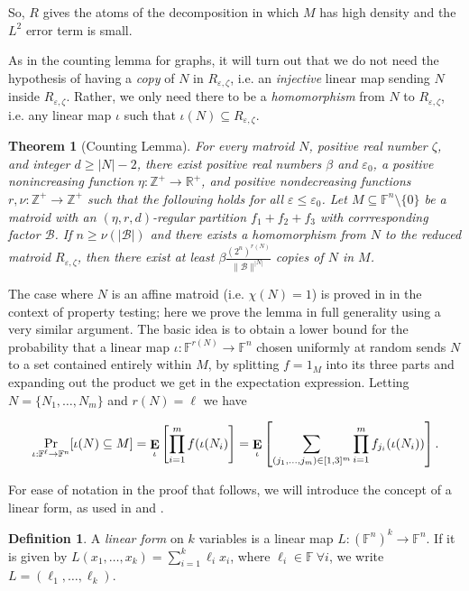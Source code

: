 \documentclass{article}
\theoremstyle{plain}
\newtheorem{thm}[theorem]{Theorem}
\theoremstyle{definition}
\theoremstyle{definition}
\newtheorem{defn}[theorem]{Definition}
\theoremstyle{remark}
\numberwithin{equation}{section}
\newcommand{\FF}{\mathbb{F}}
\newcommand{\RR}{\mathbb{R}}
\newcommand{\ZZ}{\mathbb{Z}}
\newcommand{\Esymb}{{\bf E}}
\DeclareMathOperator*{\E}{\Esymb}
\newcommand{\cB}{\mathcal B}
\begin{document}
So, $R$ gives the atoms of the decomposition in which $M$ has high density and the $L^2$ error term is small.

As in the counting lemma for graphs, it will turn out that we do not need the hypothesis of having a \emph{copy} of $N$ in $R_{\varepsilon,\zeta}$, i.e. an \emph{injective} linear map sending $N$ inside $R_{\varepsilon,\zeta}$. Rather, we only need there to be a \emph{homomorphism} from $N$ to $R_{\varepsilon,\zeta}$, i.e. any linear map $\iota$ such that $\iota(N)\subseteq R_{\varepsilon,\zeta}$.

\begin{thm}[Counting Lemma]\label{thm:counting}
For every matroid $N$, positive real number $\zeta$, and integer $d\geq |N|-2$, there exist positive real numbers $\beta$ and $\varepsilon_0$, a positive nonincreasing function $\eta:\ZZ^+\to \RR^+$, and positive nondecreasing functions $r,\nu:\ZZ^+\to \ZZ^+$ such that the following holds for all $\varepsilon\leq \varepsilon_0$. Let $M\subseteq \FF^n\setminus \{0\}$ be a matroid with an $(\eta,r,d)$-regular partition $f_1+f_2+f_3$ with corrresponding factor $\cB$. If $n\geq \nu(|\cB|)$ and there exists a homomorphism from $N$ to the reduced matroid $R_{\varepsilon,\zeta}$, then there exist at least $\beta \frac{(2^n)^{r(N)}}{\|\cB\|^{|N|}}$ copies of $N$ in $M$.
\end{thm}

The case where $N$ is an affine matroid (i.e. $\chi(N)=1$) is proved in \cite{VeryCountingMaybe} in the context of property testing; here we prove the lemma in full generality using a very similar argument. The basic idea is to obtain a lower bound for the probability that a linear map $\iota:\FF^{r(N)}\to \FF^{n}$ chosen uniformly at random sends $N$ to a set contained entirely within $M$, by splitting $f=1_M$ into its three parts and expanding out the product we get in the expectation expression. Letting $N=\{N_1,\dots,N_m\}$ and $r(N)=\ell$ we have

\[\Pr_{\iota:\FF^{\ell}\to \FF^{n}}[\iota(N)\subseteq M]=\E_{\iota}\left[\prod_{i=1}^m f(\iota(N_i)\right]=\E_{\iota}\left[\sum_{(j_1,\dots,j_m)\in [1,3]^m}\prod_{i=1}^m f_{j_i}(\iota(N_i))\right].\]

For ease of notation in the proof that follows, we will introduce the concept of a linear form, as used in \cite{VeryCountingMaybe} and \cite{hatamiRegCount}.

\begin{defn}
A \emph{linear form} on $k$ variables is a linear map $L:(\FF^n)^k\to \FF^n$. If it is given by $L(x_1,\dots,x_k)=\sum_{i=1}^k \ell_i x_i$, where $ \ell_i\in \FF ~ \forall i$, we write $L=(\ell_1,\dots,\ell_k)$.
\end{defn}
\end{document}

